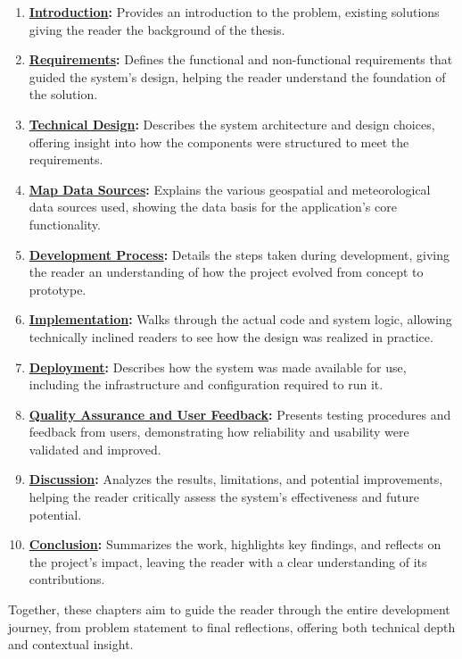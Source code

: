 \begin{enumerate}
    \item \textbf{\hyperref[chap:introduction]{Introduction}:} Provides an introduction to the problem, existing solutions giving the reader the background of the thesis.
    \item \textbf{\hyperref[chap:requirements]{Requirements}:} Defines the functional and non-functional requirements that guided the system's design, helping the reader understand the foundation of the solution.
    \item \textbf{\hyperref[chap:technicaldesign]{Technical Design}:} Describes the system architecture and design choices, offering insight into how the components were structured to meet the requirements.
    \item \textbf{\hyperref[chap:mapdatasources]{Map Data Sources}:} Explains the various geospatial and meteorological data sources used, showing the data basis for the application's core functionality.
    \item \textbf{\hyperref[chap:developmentprocess]{Development Process}:} Details the steps taken during development, giving the reader an understanding of how the project evolved from concept to prototype.
    \item \textbf{\hyperref[chap:implementation]{Implementation}:} Walks through the actual code and system logic, allowing technically inclined readers to see how the design was realized in practice.
    \item \textbf{\hyperref[chap:deployment]{Deployment}:} Describes how the system was made available for use, including the infrastructure and configuration required to run it.
    \item \textbf{\hyperref[chap:qualityassuranceanduserfeedback]{Quality Assurance and User Feedback}:} Presents testing procedures and feedback from users, demonstrating how reliability and usability were validated and improved.
    \item \textbf{\hyperref[chap:discussion]{Discussion}:} Analyzes the results, limitations, and potential improvements, helping the reader critically assess the system's effectiveness and future potential.
    \item \textbf{\hyperref[chap:conclusion]{Conclusion}:} Summarizes the work, highlights key findings, and reflects on the project's impact, leaving the reader with a clear understanding of its contributions.
\end{enumerate}

Together, these chapters aim to guide the reader through the entire development journey, from problem statement to final reflections, offering both technical depth and contextual insight.